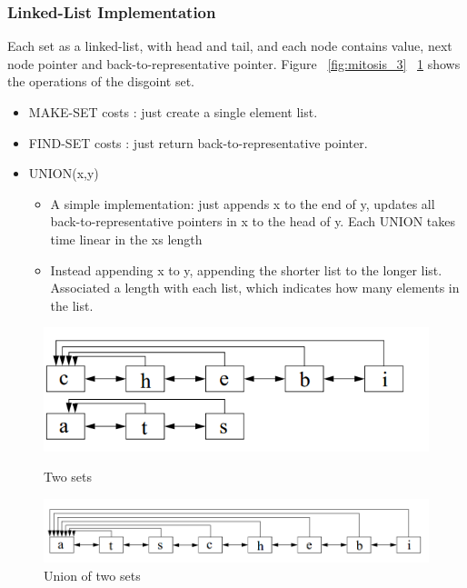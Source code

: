 \subsubsection{Linked-List Implementation}
Each set as a linked-list, with head and tail, and each node contains value, next node pointer and back-to-representative pointer.
Figure ~\ref{fig:mitosis_3} ~\ref{fig:mitosis_4} shows the operations of the disgoint set.
\begin{itemize}
\item MAKE-SET costs : just create a single element list.
\item FIND-SET costs : just return back-to-representative pointer.
\item {UNION(x,y) 
\begin{itemize}
\item {A simple implementation: just appends x to the end of y, updates all back-to-representative pointers in x to the head of y.
Each UNION takes time linear in the xs length}
\item {Instead appending x to y, appending the shorter list to the longer list.
Associated a length with each list, which indicates how many elements in the list.
}
\end{itemize}
}
\end{itemize}

\begin{figure}[ht]
\begin{minipage}[b]{0.5\linewidth}
\centering
\includegraphics[width=\textwidth]{./Figures/Mitosis_3.png}
\caption{Two sets}
\label{fig:mitosis_3}
\end{minipage}
\hspace{0.5cm}
\begin{minipage}[b]{0.5\linewidth}
\centering
\includegraphics[width=\textwidth]{./Figures/Mitosis_4.png}
\caption{Union of two sets}
\label{fig:mitosis_4}
\end{minipage}
\end{figure}


